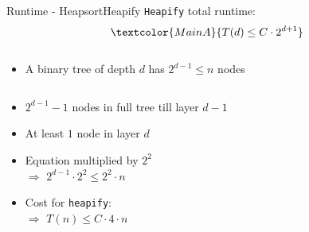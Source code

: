 \begin{frame}{Runtime - Heapsort}{Heapify}
  \texttt{Heapify} total runtime:
  \begin{displaymath}
    \textcolor{MainA}{T(d) \leq C \cdot 2^{d + 1}}
  \end{displaymath}
  \vspace{-1em}
  \begin{columns}
    \begin{column}{\linewidth}
      \begin{itemize}
        \item<2- |handout:1>
        A binary tree of depth {\color{MainA}$d$} has
        {\color{MainA}$2^{d-1} \leq n$} nodes
      \end{itemize}
    \end{column}
    \begin{column}{0pt}\end{column} %
  \end{columns}
  \begin{columns}
    \begin{column}[t]{0.5\linewidth}
      \begin{itemize}
        \item<5- |handout:1>
          {\color{MainB}$2^{d-1} - 1$} nodes in full tree till layer
          {\color{MainB}$d - 1$}
        \item<6- |handout:1>
          At least {\color{MainA}$1$} node in layer {\color{MainA}$d$}
          \vspace{1.0em}
        \item<7- |handout:1>
          {\color{Hint}Equation multiplied by $2^2$}\\
          $\Rightarrow$ {\color{MainA}$2^{d-1} \cdot 2^2 \leq 2^2 \cdot n$}
        \item<8- |handout:1>
          Cost for \texttt{heapify}:\\
          $\Rightarrow$ {\color{MainA}$T(n) \leq C \cdot 4 \cdot n$}
      \end{itemize}
    \end{column}
    \begin{column}[t]{0.5\linewidth}
    \end{column}
  \end{columns}
\end{frame}

